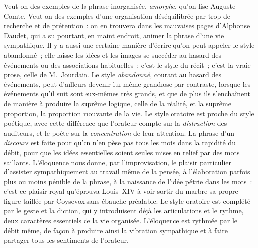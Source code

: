 \documentclass[french,twoside]{book} %
\begin{document}
Veut-on des exemples de la phrase inorganisée, \emph{amorphe}, qu’on lise Auguste Comte. Veut-on des exemples d’une organisation déséquilibrée par trop de recherche et de prétention : on en trouvera dans les mauvaises pages d’Alphonse Daudet, qui a su pourtant, en maint endroit, animer la phrase d’une vie sympathique. Il y a aussi une certaine manière d’écrire qu’on peut appeler le style abandonné ; elle laisse les idées et les images se succéder au hasard des événements ou des associations habituelles : c’est le style du récit ; c’est la vraie prose, celle de M. Jourdain. Le style \emph{abandonné}, courant au hasard des événements, peut d’ailleurs devenir lui-même grandiose par contraste, lorsque les événements qu’il suit sont eux-mêmes très grands, et que de plus ils s’enchaînent de manière à produire la suprême logique, celle de la réalité, et la suprême proportion, la proportion mouvante de la vie. Le style oratoire est proche du style poétique, avec cette différence que l’orateur compte sur la \emph{distraction} des auditeurs, et le poète sur la \emph{concentration} de leur attention. La phrase d’un \emph{discours} est faite pour qu’on n’en pèse pas tous les mots dans la rapidité du débit, pour que les idées essentielles soient seules mises en relief par des mots saillants. L’éloquence nous donne, par l’improvisation, le plaisir particulier d’assister sympathiquement au travail même de la pensée, à l’élaboration parfois plus ou moins pénible de la phrase, à la naissance de l’idée pétrie dans les mots : c’est ce plaisir royal qu’éprouva Louis XIV à voir sortir du marbre sa propre figure taillée par Coysevox sans ébauche préalable. Le style oratoire est complété par le geste et la diction, qui y introduisent déjà les articulations et le rythme, deux caractères essentiels de la vie organisée. L’éloquence est rythmée par le débit même, de façon à produire ainsi la vibration sympathique et à faire partager tous les sentiments de l’orateur.\par
\end{document}
